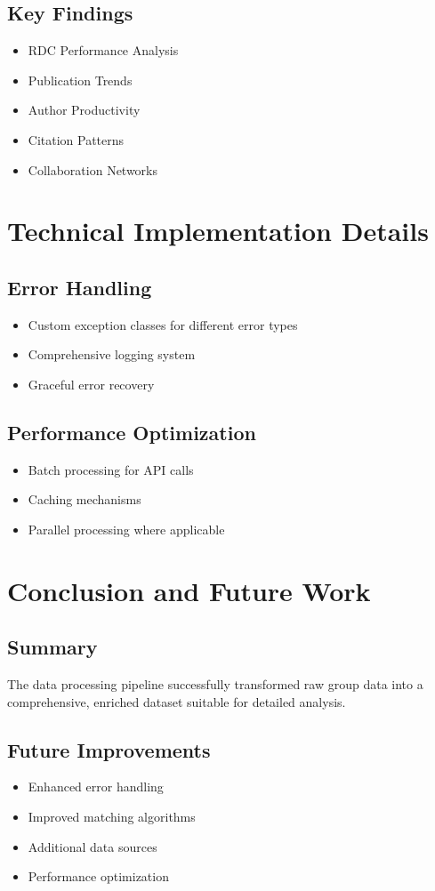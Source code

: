 \documentclass[12pt]{article}
\begin{document}
\subsection{Key Findings}
\begin{itemize}
    \item RDC Performance Analysis
    \item Publication Trends
    \item Author Productivity
    \item Citation Patterns
    \item Collaboration Networks
\end{itemize}

\section{Technical Implementation Details}

\subsection{Error Handling}
\begin{itemize}
    \item Custom exception classes for different error types
    \item Comprehensive logging system
    \item Graceful error recovery
\end{itemize}

\subsection{Performance Optimization}
\begin{itemize}
    \item Batch processing for API calls
    \item Caching mechanisms
    \item Parallel processing where applicable
\end{itemize}

\section{Conclusion and Future Work}

\subsection{Summary}
The data processing pipeline successfully transformed raw group data into a comprehensive, enriched dataset suitable for detailed analysis.

\subsection{Future Improvements}
\begin{itemize}
    \item Enhanced error handling
    \item Improved matching algorithms
    \item Additional data sources
    \item Performance optimization
\end{itemize}
\end{document}
